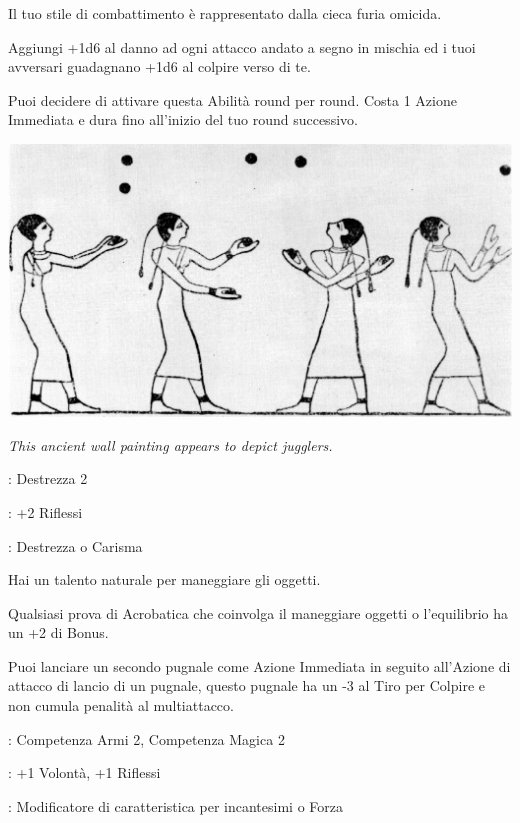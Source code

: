 \begin{multicols}{2}
Il tuo stile di combattimento è rappresentato dalla cieca furia omicida.

Aggiungi +1d6 al danno ad ogni attacco andato a segno in mischia ed i tuoi avversari guadagnano +1d6 al colpire verso di te.

Puoi decidere di attivare questa Abilità round per round. Costa 1 Azione Immediata e dura fino all'inizio del tuo round successivo.

\begin{center}
	\includegraphics[width=0.9\linewidth]{immagini/Early_Egyptian_juggling_art.png}

	\emph{This ancient wall painting appears to depict jugglers.}
\end{center}

\begin{description}[noitemsep, topsep=0pt, parsep=0pt, partopsep=0pt, leftmargin=0cm, labelwidth=2.5cm]
    \item[\textbf{Requisito}]: Destrezza 2
    \item[\textbf{Tiri Salvezza}]: +2 Riflessi
    \item[\textbf{Caratteristica}]: Destrezza o Carisma
\end{description}

Hai un talento naturale per maneggiare gli oggetti.

Qualsiasi prova di Acrobatica che coinvolga il maneggiare oggetti o l'equilibrio ha un +2 di Bonus.

Puoi lanciare un secondo pugnale come Azione Immediata in seguito all'Azione di attacco di lancio di un pugnale, questo pugnale ha un -3 al Tiro per Colpire e non cumula penalità al multiattacco.

\begin{description}[noitemsep, topsep=0pt, parsep=0pt, partopsep=0pt, leftmargin=0cm, labelwidth=2.5cm]
    \item[\textbf{Requisito}]: Competenza Armi 2, Competenza Magica 2
    \item[\textbf{Tiri Salvezza}]: +1 Volontà, +1 Riflessi
    \item[\textbf{Caratteristica}]: Modificatore di caratteristica per incantesimi o Forza
\end{description}


\end{multicols}
